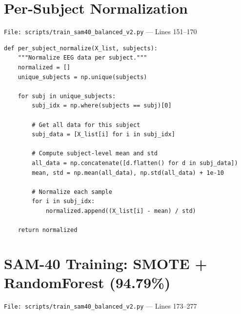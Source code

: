 \documentclass[11pt,a4paper]{article}
\begin{document}
\section{Per-Subject Normalization}
\texttt{File: scripts/train\_sam40\_balanced\_v2.py} --- Lines 151--170

\begin{lstlisting}[caption={Per-subject normalization (+12.5\% accuracy improvement on SAM-40)}]
def per_subject_normalize(X_list, subjects):
    """Normalize EEG data per subject."""
    normalized = []
    unique_subjects = np.unique(subjects)

    for subj in unique_subjects:
        subj_idx = np.where(subjects == subj)[0]

        # Get all data for this subject
        subj_data = [X_list[i] for i in subj_idx]

        # Compute subject-level mean and std
        all_data = np.concatenate([d.flatten() for d in subj_data])
        mean, std = np.mean(all_data), np.std(all_data) + 1e-10

        # Normalize each sample
        for i in subj_idx:
            normalized.append((X_list[i] - mean) / std)

    return normalized
\end{lstlisting}

\section{SAM-40 Training: SMOTE + RandomForest (94.79\%)}
\texttt{File: scripts/train\_sam40\_balanced\_v2.py} --- Lines 173--277
\end{document}
